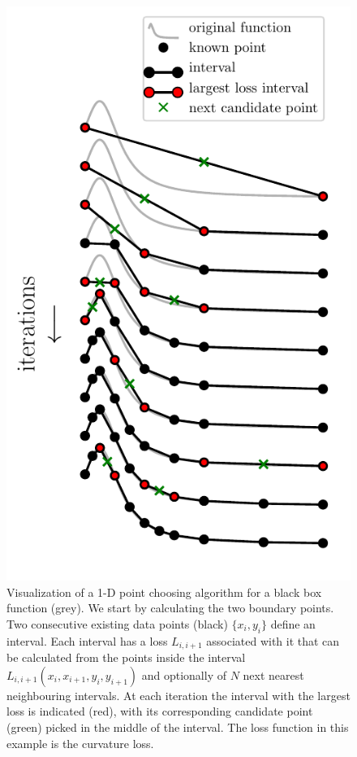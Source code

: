\begin{figure}
\hypertarget{fig:algo}{%
\centering
\includegraphics{chapter_adaptive/figures/algo.pdf}
\caption{Visualization of a 1-D point choosing algorithm for a black box function (grey).
We start by calculating the two boundary points.
Two consecutive existing data points (black) $\{x_i, y_i\}$ define an interval.
Each interval has a loss $L_{i,i+1}$ associated with it that can be calculated from the points inside the interval $L_{i,i+1}(x_i, x_{i+1}, y_i, y_{i+1})$ and optionally of $N$ next nearest neighbouring intervals.
At each iteration the interval with the largest loss is indicated (red), with its corresponding candidate point (green) picked in the middle of the interval.
The loss function in this example is the curvature loss.}\label{fig:algo}
}
\end{figure}

